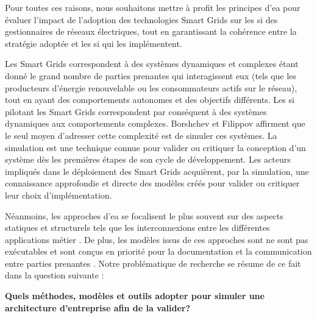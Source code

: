 Pour toutes ces raisons, nous souhaitons mettre à profit les principes 
d'\gls{ea} pour évaluer l'impact de l'adoption des technologies Smart Grids sur 
les \gls{si} des 
gestionnaires de réseaux électriques, tout en garantissant la cohérence entre la 
stratégie adoptée et les \gls{si} qui les implémentent. 



Les Smart Grids correspondent à des systèmes dynamiques et complexes 
\cite{monti_power_2010} étant donné le grand nombre de parties prenantes qui 
interagissent eux (tels que les producteurs d'énergie renouvelable ou les 
consommateurs actifs sur le réseau), tout en ayant des comportements autonomes 
et des objectifs différents. Les \gls{si} pilotant les  Smart Grids 
correspondent par conséquent à des systèmes dynamiques aux comportements 
complexes. Borshchev et 
Filippov\cite{borshchev2004system} affirment que le seul moyen d'adresser cette 
complexité est de simuler ces systèmes. La simulation est une technique connue 
pour valider ou critiquer la conception d'un système dès les premières étapes 
de son cycle de développement. Les acteurs impliqués dans le déploiement des 
Smart Grids acquièrent, par la  simulation, une connaissance approfondie et 
directe des modèles créés pour valider ou critiquer leur choix d'implémentation.

Néanmoins, les approches d'\gls{ea} se focalisent le plus souvent sur des 
aspects statiques et structurels tels que les interconnexions entre les 
différentes applications métier \cite{buckl2008towards}. De plus, les modèles 
issus de ces 
approches sont ne sont pas exécutables et sont conçus en 
priorité pour la documentation et la communication entre parties prenantes 
\cite{kulkarni2013modelling}. Notre problématique de recherche se résume de ce 
fait dans la question suivante :

\vspace*{1em}
\begin{framed}
{\bfseries Quels méthodes, modèles et outils adopter pour simuler une 
architecture d'entreprise afin de la valider?}
\end{framed}




